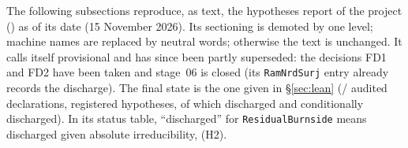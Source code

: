 The following subsections reproduce, as text, the hypotheses report of the project \cite{LLhyp}
() as of its date (15 November 2026). Its sectioning is demoted by one level;
machine names are replaced by neutral words; otherwise the text is unchanged. It calls itself provisional and has since been
partly superseded: the decisions FD1 and FD2 have been taken and stage~06 is closed (its \texttt{RamNrdSurj} entry already
records the discharge). The final state is the one given in \S\ref{sec:lean} (\GateAudited/\GateAudited{} audited
declarations, \NumHypRegistered{} registered hypotheses, of which \NumHypDischarged{} discharged and \NumHypCondDischarged{}
conditionally discharged). In its status table, ``discharged'' for \texttt{ResidualBurnside} means discharged given
absolute irreducibility, (H2).

